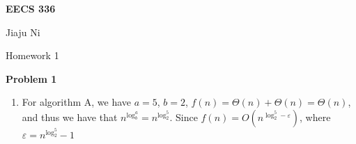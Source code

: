 \documentclass[12pt,letterpaper]{article}
\def\pp{\par\noindent}
\newcommand{\problem}[1]{ \bigskip \pp \textbf{Problem #1}\par}
\begin{document}
\centerline{\bf EECS 336}

\medskip
\centerline{Jiaju Ni}
\centerline{Homework 1}
\bigskip


\problem{1}
\begin{enumerate}[label=\alph*.]
	\item For algorithm A, we have $a=5$, $b=2$, $f(n)=\Theta(n)+\Theta(n)=\Theta(n)$, and thus we have that $n^{\log_b^a}=n^{\log_2^5}$. Since $f(n)=O(n^{\log_2^5-\varepsilon})$, where $\varepsilon=n^{\log_2^5}-1$
\end{enumerate}
\end{document}
